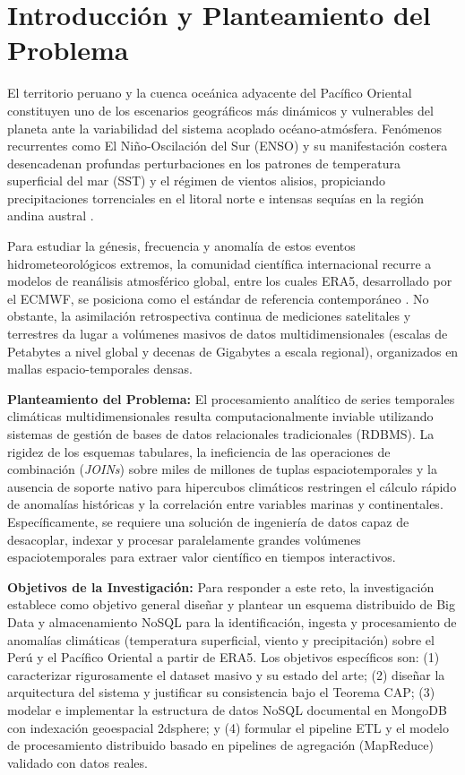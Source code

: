 \documentclass[conference]{IEEEtran}
\begin{document}
\section{Introducción y Planteamiento del Problema}

El territorio peruano y la cuenca oceánica adyacente del Pacífico Oriental constituyen uno de los escenarios geográficos más dinámicos y vulnerables del planeta ante la variabilidad del sistema acoplado océano-atmósfera. Fenómenos recurrentes como El Niño-Oscilación del Sur (ENSO) y su manifestación costera desencadenan profundas perturbaciones en los patrones de temperatura superficial del mar (SST) y el régimen de vientos alisios, propiciando precipitaciones torrenciales en el litoral norte e intensas sequías en la región andina austral \cite{peng2024extreme}. 

Para estudiar la génesis, frecuencia y anomalía de estos eventos hidrometeorológicos extremos, la comunidad científica internacional recurre a modelos de reanálisis atmosférico global, entre los cuales ERA5, desarrollado por el ECMWF, se posiciona como el estándar de referencia contemporáneo \cite{hersbach2020era5}. No obstante, la asimilación retrospectiva continua de mediciones satelitales y terrestres da lugar a volúmenes masivos de datos multidimensionales (escalas de Petabytes a nivel global y decenas de Gigabytes a escala regional), organizados en mallas espacio-temporales densas. 

\textbf{Planteamiento del Problema:} El procesamiento analítico de series temporales climáticas multidimensionales resulta computacionalmente inviable utilizando sistemas de gestión de bases de datos relacionales tradicionales (RDBMS). La rigidez de los esquemas tabulares, la ineficiencia de las operaciones de combinación (\textit{JOINs}) sobre miles de millones de tuplas espaciotemporales y la ausencia de soporte nativo para hipercubos climáticos restringen el cálculo rápido de anomalías históricas y la correlación entre variables marinas y continentales. Específicamente, se requiere una solución de ingeniería de datos capaz de desacoplar, indexar y procesar paralelamente grandes volúmenes espaciotemporales para extraer valor científico en tiempos interactivos.

\textbf{Objetivos de la Investigación:} Para responder a este reto, la investigación establece como objetivo general diseñar y plantear un esquema distribuido de Big Data y almacenamiento NoSQL para la identificación, ingesta y procesamiento de anomalías climáticas (temperatura superficial, viento y precipitación) sobre el Perú y el Pacífico Oriental a partir de ERA5. Los objetivos específicos son: (1) caracterizar rigurosamente el dataset masivo y su estado del arte; (2) diseñar la arquitectura del sistema y justificar su consistencia bajo el Teorema CAP; (3) modelar e implementar la estructura de datos NoSQL documental en MongoDB con indexación geoespacial 2dsphere; y (4) formular el pipeline ETL y el modelo de procesamiento distribuido basado en pipelines de agregación (MapReduce) validado con datos reales.
\end{document}
